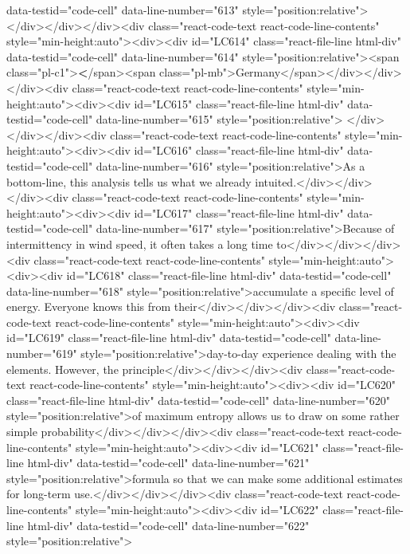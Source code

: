 {{{{data-testid="code-cell" data-line-number="613" style="position:relative">
</div></div></div><div class="react-code-text react-code-line-contents" style="min-height:auto"><div><div id="LC614" class="react-file-line html-div" data-testid="code-cell" data-line-number="614" style="position:relative"><span class="pl-c1">\textbf</span>{<span class="pl-mb">Germany</span>}</div></div></div><div class="react-code-text react-code-line-contents" style="min-height:auto"><div><div id="LC615" class="react-file-line html-div" data-testid="code-cell" data-line-number="615" style="position:relative">
</div></div></div><div class="react-code-text react-code-line-contents" style="min-height:auto"><div><div id="LC616" class="react-file-line html-div" data-testid="code-cell" data-line-number="616" style="position:relative">As a bottom-line, this analysis tells us what we already intuited.</div></div></div><div class="react-code-text react-code-line-contents" style="min-height:auto"><div><div id="LC617" class="react-file-line html-div" data-testid="code-cell" data-line-number="617" style="position:relative">Because of intermittency in wind speed, it often takes a long time to</div></div></div><div class="react-code-text react-code-line-contents" style="min-height:auto"><div><div id="LC618" class="react-file-line html-div" data-testid="code-cell" data-line-number="618" style="position:relative">accumulate a specific level of energy. Everyone knows this from their</div></div></div><div class="react-code-text react-code-line-contents" style="min-height:auto"><div><div id="LC619" class="react-file-line html-div" data-testid="code-cell" data-line-number="619" style="position:relative">day-to-day experience dealing with the elements. However, the principle</div></div></div><div class="react-code-text react-code-line-contents" style="min-height:auto"><div><div id="LC620" class="react-file-line html-div" data-testid="code-cell" data-line-number="620" style="position:relative">of maximum entropy allows us to draw on some rather simple probability</div></div></div><div class="react-code-text react-code-line-contents" style="min-height:auto"><div><div id="LC621" class="react-file-line html-div" data-testid="code-cell" data-line-number="621" style="position:relative">formula so that we can make some additional estimates for long-term use.</div></div></div><div class="react-code-text react-code-line-contents" style="min-height:auto"><div><div id="LC622" class="react-file-line html-div" data-testid="code-cell" data-line-number="622" style="position:relative">
}}}}

